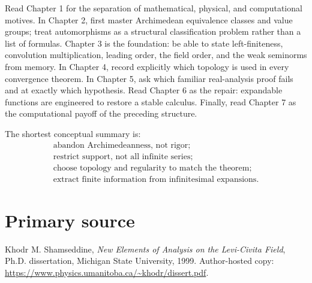 \documentclass[11pt,a4paper]{article}
\theoremstyle{remark}
\begin{document}
Read Chapter 1 for the separation of mathematical, physical, and computational motives. In
Chapter 2, first master Archimedean equivalence classes and value groups; treat automorphisms as a
structural classification problem rather than a list of formulas. Chapter 3 is the foundation:
be able to state left-finiteness, convolution multiplication, leading order, the field order, and
the weak seminorms from memory. In Chapter 4, record explicitly which topology is used in every
convergence theorem. In Chapter 5, ask which familiar real-analysis proof fails and at exactly
which hypothesis. Read Chapter 6 as the repair: expandable functions are engineered to restore a
stable calculus. Finally, read Chapter 7 as the computational payoff of the preceding structure.

The shortest conceptual summary is:
\[
\begin{gathered}
\text{abandon Archimedeanness, not rigor;}\\
\text{restrict support, not all infinite series;}\\
\text{choose topology and regularity to match the theorem;}\\
\text{extract finite information from infinitesimal expansions.}
\end{gathered}
\]

\section*{Primary source}
Khodr M. Shamseddine, \textit{New Elements of Analysis on the Levi-Civita Field},
Ph.D. dissertation, Michigan State University, 1999. Author-hosted copy:
\url{https://www.physics.umanitoba.ca/~khodr/dissert.pdf}.
\end{document}
